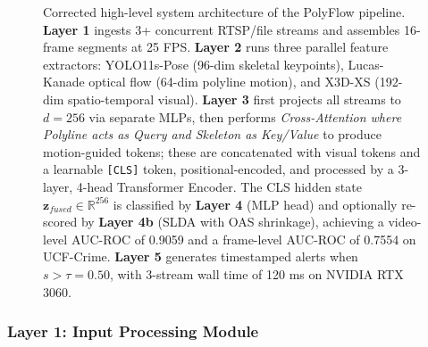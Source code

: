 \documentclass[12pt]{article}
\begin{document}
\begin{figure}[H]
{
}%
\caption{Corrected high-level system architecture of the PolyFlow pipeline. \textbf{Layer 1} ingests 3+ concurrent RTSP/file streams and assembles 16-frame segments at 25 FPS. \textbf{Layer 2} runs three parallel feature extractors: YOLO11s-Pose (96-dim skeletal keypoints), Lucas-Kanade optical flow (64-dim polyline motion), and X3D-XS (192-dim spatio-temporal visual). \textbf{Layer 3} first projects all streams to $d{=}256$ via separate MLPs, then performs \textit{Cross-Attention where Polyline acts as Query and Skeleton as Key/Value} to produce motion-guided tokens; these are concatenated with visual tokens and a learnable \texttt{[CLS]} token, positional-encoded, and processed by a 3-layer, 4-head Transformer Encoder. The CLS hidden state $\mathbf{z}_{fused}\in\mathbb{R}^{256}$ is classified by \textbf{Layer 4} (MLP head) and optionally re-scored by \textbf{Layer 4b} (SLDA with OAS shrinkage), achieving a video-level AUC-ROC of 0.9059 and a frame-level AUC-ROC of 0.7554 on UCF-Crime. \textbf{Layer 5} generates timestamped alerts when $s>\tau{=}0.50$, with 3-stream wall time of 120 ms on NVIDIA RTX 3060.}
\label{fig:system_architecture}
\end{figure}

\subsubsection{Layer 1: Input Processing Module}
\end{document}
